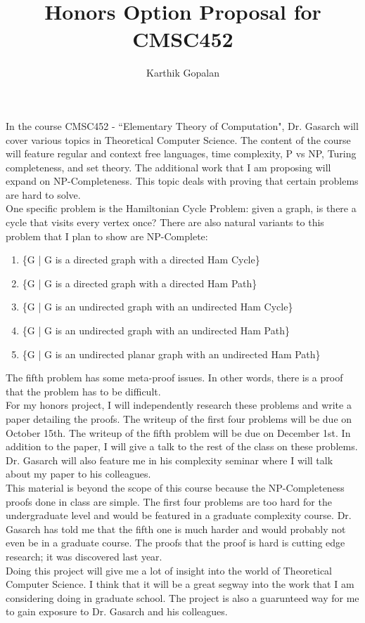 \documentclass[12pt]{article}
\author{Karthik Gopalan}
\begin{document}
\title{Honors Option Proposal for CMSC452}
\maketitle
In the course CMSC452 - ``Elementary Theory of Computation", Dr. Gasarch will cover various topics in Theoretical Computer Science. The content of the course will feature regular and context free languages, time complexity, P vs NP, Turing completeness, and set theory. The additional work that I am proposing will expand on NP-Completeness. This topic deals with proving that certain problems are hard to solve. \\

One specific problem is the Hamiltonian Cycle Problem: given a graph, is there a cycle that visits every vertex once? There are also natural variants to this problem that I plan to show are NP-Complete:

\begin{enumerate}

\item \{G | G is a directed graph with a directed Ham Cycle\}
\item \{G | G is a directed graph with a directed Ham Path\}
\item \{G | G is an undirected graph with an undirected Ham Cycle\}
\item \{G | G is an undirected graph with an undirected Ham Path\}
\item \{G | G is an undirected planar graph with an undirected Ham Path\}

\end{enumerate}
The fifth problem has some meta-proof issues. In other words, there is a proof that the problem has to be difficult. \\

For my honors project, I will independently research these problems and write
a paper detailing the proofs. The writeup of the first four problems will be due on October 15th. 
The writeup of the fifth problem will be due on December 1st. In addition to the paper, I will give a talk to the rest of the class on these problems. Dr. Gasarch will also feature me in his complexity seminar where I will talk about my 
paper to his colleagues. \\

This material is beyond the scope of this course because the NP-Completeness proofs done in class are simple.
The first four problems are too hard for the undergraduate level and would be featured in a graduate complexity course. 
Dr. Gasarch has told me that the fifth one is much harder and would probably not even be in a graduate course. The proofs that the proof is hard is cutting edge research; it was discovered last year. \\

Doing this project will give me a lot of insight into the world of Theoretical Computer Science.
I think that it will be a great segway into the work that I am considering doing in graduate school.
The project is also a guarunteed way for me to gain exposure to Dr. Gasarch and his colleagues. 
\end{document}
